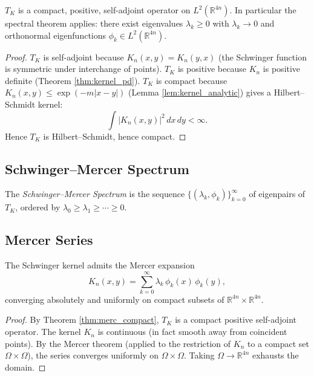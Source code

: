 \begin{theorem}
\label{thm:merc_compact}
$T_{K}$ is a compact, positive, self-adjoint operator on
$L^{2}(\mathbb{R}^{4n})$. In particular the spectral theorem applies:
there exist eigenvalues $\lambda_{k}\ge 0$ with
$\lambda_{k}\to 0$ and orthonormal eigenfunctions $\phi_{k}\in
L^{2}(\mathbb{R}^{4n})$.
\end{theorem}

\begin{proof}
$T_{K}$ is self-adjoint because $K_{n}(x,y)=K_{n}(y,x)$ (the Schwinger
function is symmetric under interchange of points). $T_{K}$ is
positive because $K_{n}$ is positive definite (Theorem
\ref{thm:kernel_pd}). $T_{K}$ is compact because
$K_{n}(x,y)\le\exp(-m|x-y|)$ (Lemma \ref{lem:kernel_analytic}) gives
a Hilbert--Schmidt kernel:
\[
\int|K_{n}(x,y)|^{2}\,dx\,dy<\infty.
\]
Hence $T_{K}$ is Hilbert--Schmidt, hence compact.
\end{proof}

\subsection{Schwinger--Mercer Spectrum}
\label{ssec:merc_spectrum}

\begin{definition}
\label{def:merc_spectrum}
The \emph{Schwinger--Mercer Spectrum} is the sequence
$\{(\lambda_{k},\phi_{k})\}_{k=0}^{\infty}$ of eigenpairs of $T_{K}$,
ordered by $\lambda_{0}\ge\lambda_{1}\ge\cdots\ge 0$.
\end{definition}

\subsection{Mercer Series}
\label{ssec:merc_series}

\begin{theorem}
\label{thm:merc_series}
The Schwinger kernel admits the Mercer expansion
\[
K_{n}(x,y)=\sum_{k=0}^{\infty}\lambda_{k}\,\phi_{k}(x)\,\phi_{k}(y),
\]
converging absolutely and uniformly on compact subsets of
$\mathbb{R}^{4n}\times\mathbb{R}^{4n}$.
\end{theorem}

\begin{proof}
By Theorem \ref{thm:merc_compact}, $T_{K}$ is a compact positive
self-adjoint operator. The kernel $K_{n}$ is continuous (in fact
smooth away from coincident points). By the Mercer theorem (applied
to the restriction of $K_{n}$ to a compact set
$\Omega\times\Omega$), the series converges uniformly on
$\Omega\times\Omega$. Taking $\Omega\to\mathbb{R}^{4n}$ exhausts the
domain.
\end{proof}

